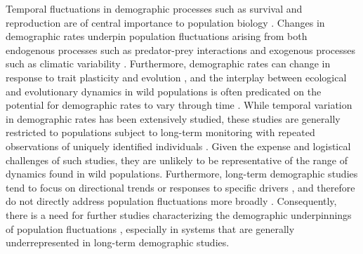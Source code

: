 \documentclass[11pt]{article}
\begin{document}
Temporal fluctuations in demographic processes such as survival and reproduction
are of central importance to population biology
\citep{twombly1994,fox2000population,koons2016life}.
Changes in demographic rates underpin population fluctuations arising from both 
endogenous processes such as predator-prey interactions 
\citep{rosenzweig1963}
and exogenous processes such as climatic variability
\citep{elton1924}.
Furthermore, demographic rates can change in response to trait plasticity and evolution
\citep{ellner2011does, bonnet2019role},
and the interplay between ecological and evolutionary dynamics in wild populations 
is often predicated on the potential for demographic rates to vary through time
\citep{coulson2006putting, siepielski2009s, ozgul2010coupled}.
While temporal variation in demographic rates has been extensively studied,
these studies are generally restricted to populations subject to long-term monitoring
with repeated observations of uniquely identified individuals 
\citep[e.g., mark-recapture;][]{forcada2008life,hunter2010climate}.
Given the expense and logistical challenges of such studies, 
they are unlikely to be representative of the range of dynamics found in wild populations.
Furthermore, long-term demographic studies tend to focus on directional trends
or responses to specific drivers 
\citep[e.g.,][]{}, 
and therefore do not directly address population fluctuations more broadly
\citep[but see][]
{white2007irruptive, koons2017understanding, taylor2018demographic, hoy2020fluctuations}.
Consequently, 
there is a need for further studies characterizing the demographic underpinnings 
of population fluctuations 
\citep{coulson2005decomposing}, 
especially in systems that are generally underrepresented 
in long-term demographic studies.
\end{document}
